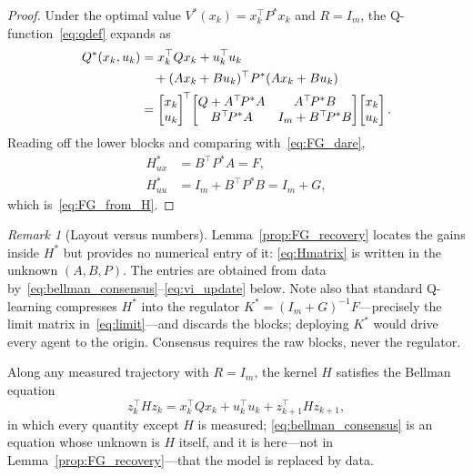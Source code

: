 \documentclass[final,5p,times]{elsarticle}
\theoremstyle{plain}
\theoremstyle{definition}
\theoremstyle{remark}
\newtheorem{remark}{Remark}
\begin{document}
\begin{proof}
Under the optimal value $V^*(x_k) = x_k^\top P^* x_k$ and $R = I_m$, the Q-function~\eqref{eq:qdef} expands as
\begin{align}
Q^*(x_k,u_k)
&= x_k^\top Q x_k + u_k^\top u_k \notag\\
&\quad + (Ax_k + Bu_k)^\top P^* (Ax_k + Bu_k) \notag\\
&= \begin{bmatrix} x_k\\ u_k\end{bmatrix}^{\!\top}\!
\begin{bmatrix} Q + A^\top\! P^* A & A^\top\! P^* B\\ B^\top\! P^* A & I_m + B^\top\! P^* B\end{bmatrix}\!
\begin{bmatrix} x_k\\ u_k\end{bmatrix}.
\end{align}
Reading off the lower blocks and comparing with~\eqref{eq:FG_dare},
\begin{align}
H_{ux}^* &= B^\top P^* A = F,\\
H_{uu}^* &= I_m + B^\top P^* B = I_m + G,
\end{align}
which is~\eqref{eq:FG_from_H}.
\end{proof}
\begin{remark}[Layout versus numbers]
\label{rem:layout}
Lemma~\ref{prop:FG_recovery} locates the gains inside $H^*$ but provides no numerical entry of it: \eqref{eq:Hmatrix} is written in the unknown $(A,B,P)$. The entries are obtained from data by~\eqref{eq:bellman_consensus}--\eqref{eq:vi_update} below. Note also that standard Q-learning compresses $H^*$ into the regulator $K^* = (I_m+G)^{-1}F$---precisely the limit matrix in~\eqref{eq:limit}---and discards the blocks; deploying $K^*$ would drive every agent to the origin. Consensus requires the raw blocks, never the regulator.
\end{remark}
Along any measured trajectory with $R = I_m$, the kernel $H$ satisfies the Bellman equation
\begin{equation}
z_k^\top H z_k = x_k^\top Q x_k + u_k^\top u_k + z_{k+1}^\top H z_{k+1},
\label{eq:bellman_consensus}
\end{equation}
in which every quantity except $H$ is measured; \eqref{eq:bellman_consensus} is an equation whose unknown is $H$ itself, and it is here---not in Lemma~\ref{prop:FG_recovery}---that the model is replaced by data.
\end{document}
